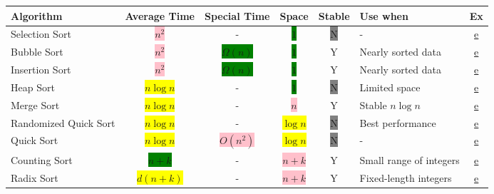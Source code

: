 \begin{table}[H]
    \centering
    \begin{tabular}{|l|cc|c|c|l|c|}
        \hline
        \textbf{Algorithm}    & \textbf{Average Time}         & \textbf{Special Time}         & \textbf{Space}              & \textbf{Stable}    & \textbf{Use when}       & \textbf{Ex}                     \\
        \hline
        Selection Sort        & \colorbox{pink}{$n^2$}        & -                             & \colorbox{green}{$1$}       & \colorbox{gray}{N} & -                       & \hyperref[eg:selection_sort]{e} \\
        Bubble Sort           & \colorbox{pink}{$n^2$}        & \colorbox{green}{$\Omega(n)$} & \colorbox{green}{$1$}       & Y                  & Nearly sorted data      & \hyperref[eg:bubble_sort]{e}    \\
        Insertion Sort        & \colorbox{pink}{$n^2$}        & \colorbox{green}{$\Omega(n)$} & \colorbox{green}{$1$}       & Y                  & Nearly sorted data      & \hyperref[eg:insertion_sort]{e} \\
        \hline
        Heap Sort             & \colorbox{yellow}{$n \log n$} & -                             & \colorbox{green}{$1$}       & \colorbox{gray}{N} & Limited space           & \hyperref[eg:heap_sort]{e}      \\
        Merge Sort            & \colorbox{yellow}{$n \log n$} & -                             & \colorbox{pink}{$n$}        & Y                  & Stable $n\log n$        & \hyperref[eg:merge_sort]{e}     \\
        Randomized Quick Sort & \colorbox{yellow}{$n \log n$} & -                             & \colorbox{yellow}{$\log n$} & \colorbox{gray}{N} & Best performance        & \hyperref[eg:quick_sort]{e}     \\
        Quick Sort            & \colorbox{yellow}{$n \log n$} & \colorbox{pink}{$O(n^2)$}     & \colorbox{yellow}{$\log n$} & \colorbox{gray}{N} & -                       & \hyperref[eg:quick_sort]{e}     \\
        \hline
        Counting Sort         & \colorbox{green}{$n+k$}       & -                             & \colorbox{pink}{$n+k$}      & Y                  & Small range of integers & \hyperref[eg:count_sort]{e}     \\
        Radix Sort            & \colorbox{yellow}{$d(n+k)$}   & -                             & \colorbox{pink}{$n+k$}      & Y                  & Fixed-length integers   & \hyperref[eg:radix_sort]{e}     \\
        \hline
    \end{tabular}
\end{table}
\label{subsec:sort_summary}

